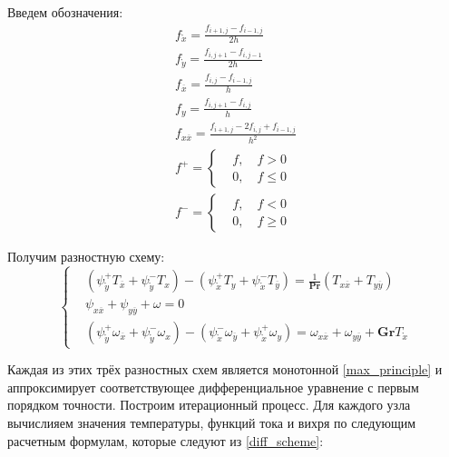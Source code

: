 \documentclass[a4paper, 12pt]{article}
\newcommand{\Pra}{\mathbf{Pr}}
\newcommand{\Gra}{\mathbf{Gr}}
\newcommand{\psp}[2]{\psi_{\mathring{#1}}^{#2}}
\begin{document}
    Введем обозначения:
    \begin{gather*}
      f_{\mathring{x}} = \frac{f_{i+1,j} - f_{i-1,j}}{2 h}
      \\
      f_{\mathring{y}} = \frac{f_{i,j+1} - f_{i,j-1}}{2 h}
      \\
      f_{\overline{x}} = \frac{f_{i,j} - f_{i-1,j}}{h}
      \\
      f_{y} = \frac{f_{i,j+1} - f_{i,j}}{h}
      \\
      f_{x \overline{x}} = \frac{f_{i+1,j} - 2 f_{i,j} + f_{i-1,j}}{h^2}
      \\
      f^{+} = \left\{
        \begin{aligned}
          &f, \quad f > 0\\
          &0, \quad f \leq 0
        \end{aligned}
      \right.
      \\
      f^{-} = \left\{
        \begin{aligned}
          &f, \quad f < 0\\
          &0, \quad f \geq 0
        \end{aligned}
      \right.
    \end{gather*}

    Получим разностную схему:
    \begin{equation}
      \left\{
        \begin{aligned}
          &\left( \psp{y}{+} T_{\overline{x}} + \psp{y}{-} T_{x} \right) -
            \left( \psp{x}{+} T_{y} + \psp{x}{-} T_{\overline{y}} \right) =
            \frac{1}{\Pra}\left( T_{x \overline{x}} + T_{y \overline{y}} \right)
          \\
          &\psi_{x \overline{x}} + \psi_{y \overline{y}} + \omega = 0
          \\
          &\left(
            \psp{y}{+} \omega_{\overline{x}} + \psp{y}{-} \omega_{x}
          \right) - \left(
            \psp{x}{-} \omega_{\overline{y}} + \psp{x}{+} \omega_{y}
          \right) =
            \omega_{x \overline{x}} + \omega_{y \overline{y}} +
            \Gra T_{\mathring{x}}
        \end{aligned}
      \right.\label{diff_scheme}
    \end{equation}

    Каждая из этих трёх разностных схем является монотонной
    \eqref{max_principle} и аппроксимирует соответствующее дифференциальное
    уравнение с первым порядком точности. Построим итерационный процесс. Для
    каждого узла вычислияем значения температуры, функций тока и вихря по
    следующим расчетным формулам, которые следуют из \eqref{diff_scheme}:
\end{document}

